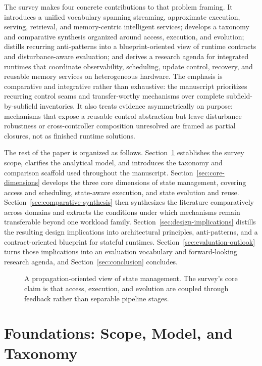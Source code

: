 \documentclass[acmsmall,screen,review]{acmart}
\begin{document}
The survey makes four concrete contributions to that problem framing. It introduces a unified vocabulary spanning streaming, approximate execution, serving, retrieval, and memory-centric intelligent services; develops a taxonomy and comparative synthesis organized around access, execution, and evolution; distills recurring anti-patterns into a blueprint-oriented view of runtime contracts and disturbance-aware evaluation; and derives a research agenda for integrated runtimes that coordinate observability, scheduling, update control, recovery, and reusable memory services on heterogeneous hardware. The emphasis is comparative and integrative rather than exhaustive: the manuscript prioritizes recurring control seams and transfer-worthy mechanisms over complete subfield-by-subfield inventories. It also treats evidence asymmetrically on purpose: mechanisms that expose a reusable control abstraction but leave disturbance robustness or cross-controller composition unresolved are framed as partial closures, not as finished runtime solutions.

The rest of the paper is organized as follows. Section~\ref{sec:foundations} establishes the survey scope, clarifies the analytical model, and introduces the taxonomy and comparison scaffold used throughout the manuscript. Section~\ref{sec:core-dimensions} develops the three core dimensions of state management, covering access and scheduling, state-aware execution, and state evolution and reuse. Section~\ref{sec:comparative-synthesis} then synthesizes the literature comparatively across domains and extracts the conditions under which mechanisms remain transferable beyond one workload family. Section~\ref{sec:design-implications} distills the resulting design implications into architectural principles, anti-patterns, and a contract-oriented blueprint for stateful runtimes. Section~\ref{sec:evaluation-outlook} turns those implications into an evaluation vocabulary and forward-looking research agenda, and Section~\ref{sec:conclusion} concludes.

\begin{figure}[t]
\centering

\caption{A propagation-oriented view of state management. The survey's core claim is that access, execution, and evolution are coupled through feedback rather than separable pipeline stages.}
\label{fig:propagation}
\end{figure}

\section{Foundations: Scope, Model, and Taxonomy}
\label{sec:foundations}
\end{document}

